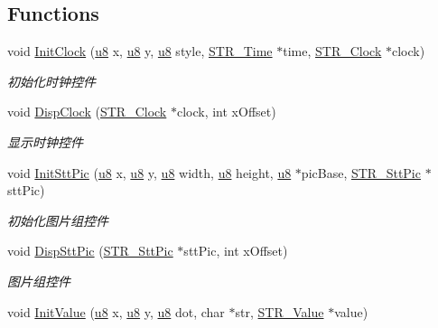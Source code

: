 \subsection*{\-Functions}
\begin{DoxyCompactItemize}
\item 
void \hyperlink{group___w_i_d_g_e_t_ga7338b1b845ab8569f825f48754d4702c}{\-Init\-Clock} (\hyperlink{group___b_s_p_gaed742c436da53c1080638ce6ef7d13de}{u8} x, \hyperlink{group___b_s_p_gaed742c436da53c1080638ce6ef7d13de}{u8} y, \hyperlink{group___b_s_p_gaed742c436da53c1080638ce6ef7d13de}{u8} style, \hyperlink{struct_s_t_r___time}{\-S\-T\-R\-\_\-\-Time} $\ast$time, \hyperlink{struct_s_t_r___clock}{\-S\-T\-R\-\_\-\-Clock} $\ast$clock)
\begin{DoxyCompactList}\small\item\em 初始化时钟控件 \end{DoxyCompactList}\item 
void \hyperlink{group___w_i_d_g_e_t_gae106cd7bf5dbfbc9806614193eb0f2b6}{\-Disp\-Clock} (\hyperlink{struct_s_t_r___clock}{\-S\-T\-R\-\_\-\-Clock} $\ast$clock, int x\-Offset)
\begin{DoxyCompactList}\small\item\em 显示时钟控件 \end{DoxyCompactList}\item 
void \hyperlink{group___w_i_d_g_e_t_ga5fa501fc4c260c0bd86b52471f33a411}{\-Init\-Stt\-Pic} (\hyperlink{group___b_s_p_gaed742c436da53c1080638ce6ef7d13de}{u8} x, \hyperlink{group___b_s_p_gaed742c436da53c1080638ce6ef7d13de}{u8} y, \hyperlink{group___b_s_p_gaed742c436da53c1080638ce6ef7d13de}{u8} width, \hyperlink{group___b_s_p_gaed742c436da53c1080638ce6ef7d13de}{u8} height, \hyperlink{group___b_s_p_gaed742c436da53c1080638ce6ef7d13de}{u8} $\ast$pic\-Base, \hyperlink{struct_s_t_r___stt_pic}{\-S\-T\-R\-\_\-\-Stt\-Pic} $\ast$stt\-Pic)
\begin{DoxyCompactList}\small\item\em 初始化图片组控件 \end{DoxyCompactList}\item 
void \hyperlink{group___w_i_d_g_e_t_gaa4a2492358bbb448b4bd8e1b9792bdb2}{\-Disp\-Stt\-Pic} (\hyperlink{struct_s_t_r___stt_pic}{\-S\-T\-R\-\_\-\-Stt\-Pic} $\ast$stt\-Pic, int x\-Offset)
\begin{DoxyCompactList}\small\item\em 图片组控件 \end{DoxyCompactList}\item 
void \hyperlink{group___w_i_d_g_e_t_ga7a6ad9f67f512cb71394be195152a1bc}{\-Init\-Value} (\hyperlink{group___b_s_p_gaed742c436da53c1080638ce6ef7d13de}{u8} x, \hyperlink{group___b_s_p_gaed742c436da53c1080638ce6ef7d13de}{u8} y, \hyperlink{group___b_s_p_gaed742c436da53c1080638ce6ef7d13de}{u8} dot, char $\ast$str, \hyperlink{struct_s_t_r___value}{\-S\-T\-R\-\_\-\-Value} $\ast$value)

\end{DoxyCompactItemize}
